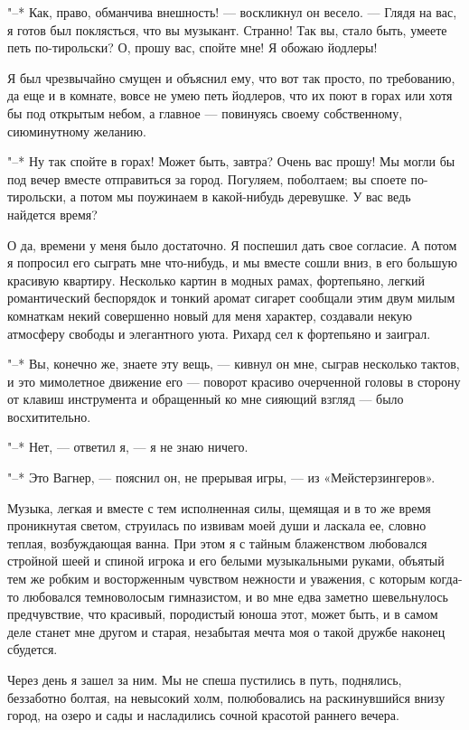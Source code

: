 "--* Как,  право, обманчива внешность!  --- воскликнул он  весело. ---
Глядя на  вас, я готов был  поклясться, что вы музыкант.  Странно! Так
вы, стало быть, умеете петь по-тирольски?  О, прошу вас, спойте мне! Я
обожаю йодлеры!

Я  был чрезвычайно  смущен  и объяснил  ему, что  вот  так просто,  по
требованию, да  еще и в комнате,  вовсе не умею петь  йодлеров, что их
поют в горах  или хотя бы под открытым небом,  а главное --- повинуясь
своему собственному, сиюминутному желанию.

"--* Ну  так спойте в горах!  Может быть, завтра? Очень  вас прошу! Мы
могли бы под  вечер вместе отправиться за  город. Погуляем, поболтаем;
вы споете по-тирольски, а потом мы поужинаем в какой-нибудь деревушке.
У вас ведь найдется время?

О да, времени у меня было достаточно. Я поспешил дать свое согласие. А
потом я попросил его сыграть мне что-нибудь, и мы вместе сошли вниз, в
его  большую  красивую  квартиру.  Несколько картин  в  модных  рамах,
фортепьяно, легкий  романтический беспорядок  и тонкий  аромат сигарет
сообщали этим  двум милым  комнаткам некий  совершенно новый  для меня
характер, создавали некую атмосферу свободы и элегантного уюта. Рихард
сел к фортепьяно и заиграл.

"--*  Вы, конечно  же,  знаете эту  вещь, ---  кивнул  он мне,  сыграв
несколько тактов,  и это мимолетное  движение его ---  поворот красиво
очерченной головы в сторону от  клавиш инструмента и обращенный ко мне
сияющий взгляд --- было восхитительно.

"--* Нет, --- ответил я, --- я не знаю ничего.

"--*  Это   Вагнер,  ---  пояснил   он,  не  прерывая  игры,   ---  из
«Мейстерзингеров».

Музыка, легкая  и вместе  с тем  исполненная силы, щемящая  и в  то же
время проникнутая светом, струилась по извивам моей души и ласкала ее,
словно теплая,  возбуждающая ванна.  При этом  я с  тайным блаженством
любовался  стройной шеей  и спиной  игрока и  его белыми  музыкальными
руками,  объятый тем  же  робким и  восторженным  чувством нежности  и
уважения, с которым когда-то  любовался темноволосым гимназистом, и во
мне едва  заметно шевельнулось предчувствие, что  красивый, породистый
юноша этот,  может быть, и  в самом деле  станет мне другом  и старая,
незабытая мечта моя о такой дружбе наконец сбудется.

Через день  я зашел за ним.  Мы не спеша пустились  в путь, поднялись,
беззаботно болтая,  на невысокий  холм, полюбовались  на раскинувшийся
внизу город,  на озеро  и сады и  насладились сочной  красотой раннего
вечера.

